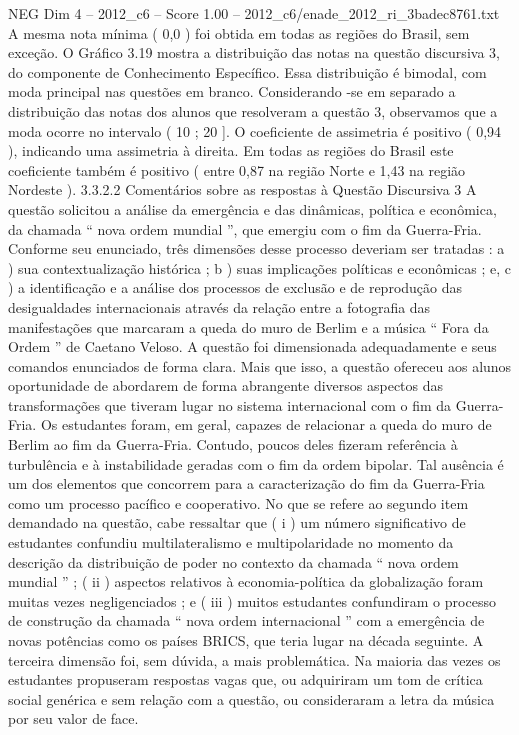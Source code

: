 \begin{textsample}{NEG Dim 4 – 2012\_c6 – Score 1.00 – 2012\_c6/enade\_2012\_ri\_3badec8761.txt}
A mesma nota mínima ( 0,0 ) foi obtida em todas as regiões do Brasil, sem exceção.
O Gráfico 3.19 mostra a distribuição das notas na questão discursiva 3, do componente de Conhecimento Específico.
Essa distribuição é bimodal, com moda principal nas questões em branco.
Considerando -se em separado a distribuição das notas dos alunos que resolveram a questão 3, observamos que a moda ocorre no intervalo ( 10 ; 20 ].
O coeficiente de assimetria é positivo ( 0,94 ), indicando uma assimetria à direita.
Em todas as regiões do Brasil este coeficiente também é positivo ( entre 0,87 na região Norte e 1,43 na região Nordeste ). 3.3.2.2 Comentários sobre as respostas à Questão Discursiva 3 A questão solicitou a análise da emergência e das dinâmicas, política e econômica, da chamada “ nova ordem mundial ”, que emergiu com o fim da Guerra-Fria.
Conforme seu enunciado, três dimensões desse processo deveriam ser tratadas : a ) sua contextualização histórica ; b ) suas implicações políticas e econômicas ; e, c ) a identificação e a análise dos processos de exclusão e de reprodução das desigualdades internacionais através da relação entre a fotografia das manifestações que marcaram a queda do muro de Berlim e a música “ Fora da Ordem ” de Caetano Veloso.
A questão foi dimensionada adequadamente e seus comandos enunciados de forma clara.
Mais que isso, a questão ofereceu aos alunos oportunidade de abordarem de forma abrangente diversos aspectos das transformações que tiveram lugar no sistema internacional com o fim da Guerra-Fria.
Os estudantes foram, em geral, capazes de relacionar a queda do muro de Berlim ao fim da Guerra-Fria.
Contudo, poucos deles fizeram referência à turbulência e à instabilidade geradas com o fim da ordem bipolar.
Tal ausência é um dos elementos que concorrem para a caracterização do fim da Guerra-Fria como um processo pacífico e cooperativo.
No que se refere ao segundo item demandado na questão, cabe ressaltar que ( i ) um número significativo de estudantes confundiu multilateralismo e multipolaridade no momento da descrição da distribuição de poder no contexto da chamada “ nova ordem mundial ” ; ( ii ) aspectos relativos à economia-política da globalização foram muitas vezes negligenciados ; e ( iii ) muitos estudantes confundiram o processo de construção da chamada “ nova ordem internacional ” com a emergência de novas potências como os países BRICS, que teria lugar na década seguinte.
A terceira dimensão foi, sem dúvida, a mais problemática.
Na maioria das vezes os estudantes propuseram respostas vagas que, ou adquiriram um tom de crítica social genérica e sem relação com a questão, ou consideraram a letra da música por seu valor de face.

\end{textsample}

